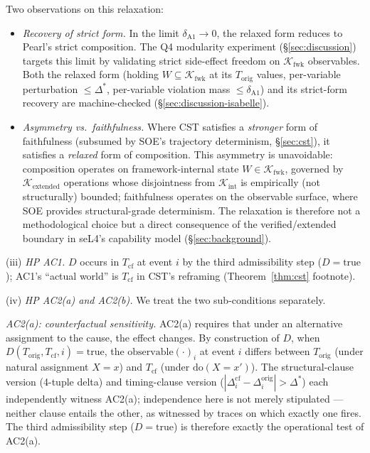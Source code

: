 \documentclass[conference]{IEEEtran}
\newcommand{\Korig}{T_\text{orig}}
\newcommand{\Tcf}{T_\text{cf}}
\newcommand{\Kextended}{\mathcal{K}_\text{extended}}
\newcommand{\Kint}{\mathcal{K}_\text{int}}
\newcommand{\Kfwk}{\mathcal{K}_\text{fwk}}
\newcommand{\Dstar}{\Delta^{*}}
\newcommand{\dox}[1]{\text{do}(X{=}#1)}
\begin{document}
Two observations on this relaxation:
\begin{itemize}[leftmargin=*]
  \item \emph{Recovery of strict form.} In the limit
    $\delta_{\text{A1}} \to 0$, the relaxed form reduces to
    Pearl's strict composition. The Q4 modularity experiment
    (\S\ref{sec:discussion}) targets this limit by validating
    strict side-effect freedom on $\Kfwk$ observables. Both the
    relaxed form (holding $W \subseteq \Kfwk$ at its $\Korig$
    values, per-variable perturbation $\leq \Dstar$, per-variable
    violation mass $\leq \delta_{\text{A1}}$) and its strict-form
    recovery are machine-checked (\S\ref{sec:discussion-isabelle}).
  \item \emph{Asymmetry vs.\ faithfulness.} Where CST satisfies a
    \emph{stronger} form of faithfulness (subsumed by SOE's
    trajectory determinism, \S\ref{sec:cst}), it satisfies a
    \emph{relaxed} form of composition. This asymmetry is
    unavoidable: composition operates on framework-internal state
    $W \in \Kfwk$, governed by $\Kextended$ operations whose
    disjointness from $\Kint$ is empirically (not structurally)
    bounded; faithfulness operates on the observable surface,
    where SOE provides structural-grade determinism. The
    relaxation is therefore not a methodological choice but a
    direct consequence of the verified/extended boundary in
    seL4's capability model (\S\ref{sec:background}).
\end{itemize}

(iii) \emph{HP AC1.} $D$ occurs in $\Tcf$ at event $i$ by the
third admissibility step ($D = \text{true}$); AC1's ``actual
world'' is $\Tcf$ in CST's reframing (Theorem~\ref{thm:cst}
footnote).

(iv) \emph{HP AC2(a) and AC2(b).} We treat the two sub-conditions
separately.

\emph{AC2(a): counterfactual sensitivity.} AC2(a) requires that
under an alternative assignment to the cause, the effect changes.
By construction of $D$, when $D(\Korig, \Tcf, i) = \text{true}$,
the $\text{observable}(\cdot)_i$ at event $i$ differs between
$\Korig$ (under natural assignment $X = x$) and $\Tcf$ (under
$\dox{x'}$). The structural-clause version (4-tuple delta) and
timing-clause version
($|\Delta_i^{\text{cf}} - \Delta_i^{\text{orig}}| > \Dstar$) each
independently witness AC2(a); independence here is not merely
stipulated --- neither clause entails the other, as witnessed by
traces on which exactly one fires. The third admissibility step
($D = \text{true}$) is therefore exactly the operational test of
AC2(a).
\end{document}
